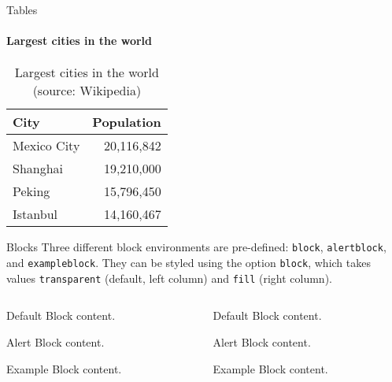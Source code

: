 \documentclass[10pt]{beamer}
\begin{document}
\begin{frame}{Tables}
  \framesubtitle{Largest cities in the world}
  \begin{table}
    \caption{Largest cities in the world (source: Wikipedia)}
    \begin{tabular}{@{} lr @{}}
      \toprule
      City        & Population \\
      \midrule
      Mexico City & 20,116,842 \\
      Shanghai    & 19,210,000 \\
      Peking      & 15,796,450 \\
      Istanbul    & 14,160,467 \\
      \bottomrule
    \end{tabular}
  \end{table}
\end{frame}
\begin{frame}[fragile]{Blocks}
  Three different block environments are pre-defined: \verb|block|, \verb|alertblock|,
  and \verb|exampleblock|. They can be styled using the option
  \verb|block|, which takes values \verb|transparent| (default, left column) and \verb|fill| (right column).

  \begin{columns}[T]
    \begin{column}{0.45\textwidth}
      \begin{block}{Default}
        Block content.
      \end{block}

      \begin{alertblock}{Alert}
        Block content.
      \end{alertblock}

      \begin{exampleblock}{Example}
        Block content.
      \end{exampleblock}
    \end{column}
    \begin{column}{0.45\textwidth}
      {

        \begin{block}{Default}
          Block content.
        \end{block}

        \begin{alertblock}{Alert}
          Block content.
        \end{alertblock}

        \begin{exampleblock}{Example}
          Block content.
        \end{exampleblock}
      }
    \end{column}
  \end{columns}
\end{frame}
\end{document}
